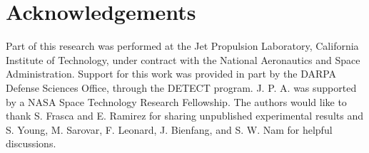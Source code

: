 \documentclass[%
reprint,
 amsmath,amssymb,
aps,
pra,
]{revtex4-1}
\begin{document}
\section*{\label{sec:Acknowledgements}Acknowledgements}
\quad Part of this research was performed at the Jet Propulsion Laboratory, California Institute of Technology, under contract with the National Aeronautics and Space Administration.  Support for this work was provided in part by the DARPA Defense Sciences Office, through the DETECT program.  J. P. A. was supported by a NASA Space Technology Research Fellowship.  The authors would like to thank S. Frasca and E. Ramirez for sharing unpublished experimental results and S. Young, M. Sarovar, F. Leonard, J. Bienfang, and S. W. Nam for helpful discussions. 

\nocite{apsrev41Control}


\end{document}

